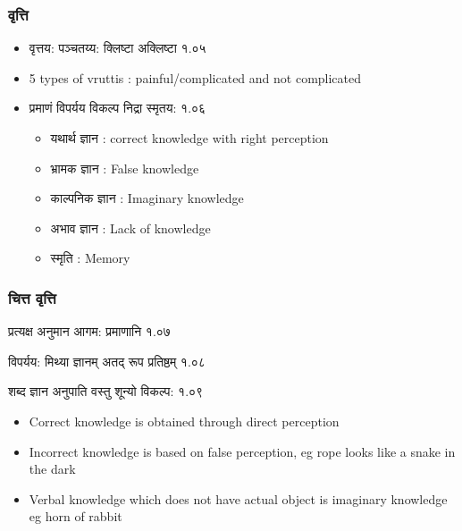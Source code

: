 \begin{frame}[fragile]\frametitle{वृत्ति}

	\begin{itemize}
	\item वृत्तय: पञ्चतय्य: क्लिष्टा अक्लिष्टा १.०५
	\item 5 types of vruttis : painful/complicated and not complicated
	\item प्रमाणं विपर्यय विकल्प निद्रा स्मृतय: १.०६
		\begin{itemize}
		\item यथार्थ ज्ञान : correct knowledge with right perception
		\item भ्रामक ज्ञान : False knowledge
		\item काल्पनिक ज्ञान : Imaginary knowledge
		\item अभाव ज्ञान : Lack of knowledge
		\item स्मृति : Memory
		
		\end{itemize}	
	\end{itemize}

\end{frame}

\begin{frame}[fragile]\frametitle{चित्त वृत्ति}

\begin{sanskrit}
प्रत्यक्ष अनुमान आगम: प्रमाणानि १.०७

विपर्यय: मिथ्या ज्ञानम् अतद् रूप प्रतिष्ठम् १.०८

शब्द ज्ञान अनुपाति वस्तु शून्यो विकल्प: १.०९
\end{sanskrit}


	\begin{itemize}
	\item Correct knowledge is obtained through direct perception
	\item Incorrect knowledge is based on false perception, eg rope looks like a snake in the dark
	\item Verbal knowledge which does not have actual object is imaginary knowledge eg horn of rabbit
	\end{itemize}

\end{frame}
